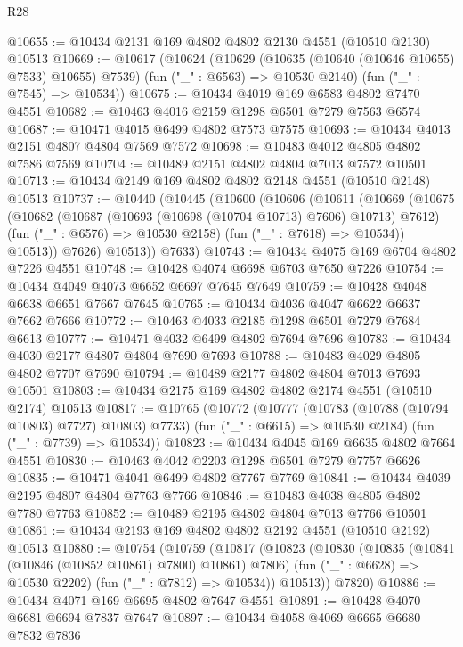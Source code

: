 \begin{lexlean}{R28}
\begin{coremodule}
@10655 := @10434 @2131 @169 @4802 @4802 @2130 @4551 (@10510 @2130) @10513
@10669 := @10617
    (@10624
      (@10629 (@10635 (@10640 (@10646 @10655) @7533) @10655) @7539)
      (fun ("_" : @6563) => @10530 @2140)
      (fun ("_" : @7545) => @10534))
@10675 := @10434 @4019 @169 @6583 @4802 @7470 @4551
@10682 := @10463 @4016 @2159 @1298 @6501 @7279 @7563 @6574
@10687 := @10471 @4015 @6499 @4802 @7573 @7575
@10693 := @10434 @4013 @2151 @4807 @4804 @7569 @7572
@10698 := @10483 @4012 @4805 @4802 @7586 @7569
@10704 := @10489 @2151 @4802 @4804 @7013 @7572 @10501
@10713 := @10434 @2149 @169 @4802 @4802 @2148 @4551 (@10510 @2148) @10513
@10737 := @10440
    (@10445
      (@10600
        (@10606
          (@10611
            (@10669
              (@10675
                (@10682
                  (@10687 (@10693 (@10698 (@10704 @10713) @7606) @10713) @7612)
                  (fun ("_" : @6576) => @10530 @2158)
                  (fun ("_" : @7618) => @10534))
                @10513))
            @7626)
          @10513))
      @7633)
@10743 := @10434 @4075 @169 @6704 @4802 @7226 @4551
@10748 := @10428 @4074 @6698 @6703 @7650 @7226
@10754 := @10434 @4049 @4073 @6652 @6697 @7645 @7649
@10759 := @10428 @4048 @6638 @6651 @7667 @7645
@10765 := @10434 @4036 @4047 @6622 @6637 @7662 @7666
@10772 := @10463 @4033 @2185 @1298 @6501 @7279 @7684 @6613
@10777 := @10471 @4032 @6499 @4802 @7694 @7696
@10783 := @10434 @4030 @2177 @4807 @4804 @7690 @7693
@10788 := @10483 @4029 @4805 @4802 @7707 @7690
@10794 := @10489 @2177 @4802 @4804 @7013 @7693 @10501
@10803 := @10434 @2175 @169 @4802 @4802 @2174 @4551 (@10510 @2174) @10513
@10817 := @10765
    (@10772
      (@10777 (@10783 (@10788 (@10794 @10803) @7727) @10803) @7733)
      (fun ("_" : @6615) => @10530 @2184)
      (fun ("_" : @7739) => @10534))
@10823 := @10434 @4045 @169 @6635 @4802 @7664 @4551
@10830 := @10463 @4042 @2203 @1298 @6501 @7279 @7757 @6626
@10835 := @10471 @4041 @6499 @4802 @7767 @7769
@10841 := @10434 @4039 @2195 @4807 @4804 @7763 @7766
@10846 := @10483 @4038 @4805 @4802 @7780 @7763
@10852 := @10489 @2195 @4802 @4804 @7013 @7766 @10501
@10861 := @10434 @2193 @169 @4802 @4802 @2192 @4551 (@10510 @2192) @10513
@10880 := @10754
    (@10759
      (@10817
        (@10823
          (@10830
            (@10835 (@10841 (@10846 (@10852 @10861) @7800) @10861) @7806)
            (fun ("_" : @6628) => @10530 @2202)
            (fun ("_" : @7812) => @10534))
          @10513))
      @7820)
@10886 := @10434 @4071 @169 @6695 @4802 @7647 @4551
@10891 := @10428 @4070 @6681 @6694 @7837 @7647
@10897 := @10434 @4058 @4069 @6665 @6680 @7832 @7836

\end{coremodule}
\end{lexlean}
